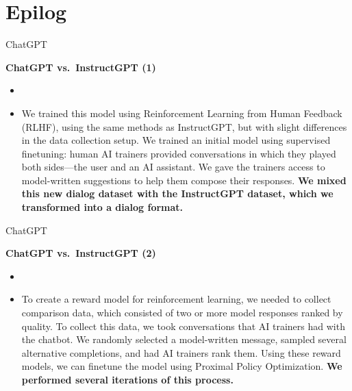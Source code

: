 


\section{Epilog}






\begin{vbframe}{ChatGPT}

\vfill

\textbf{ChatGPT vs.\ InstructGPT (1)}

	\begin{itemize}
		\item \href{https://openai.com/blog/chatgpt}{}
		\item
                We trained this model using Reinforcement
		Learning from Human Feedback (RLHF), using
		the same methods as InstructGPT, but with
		slight differences in the data collection
		setup. We trained an initial model using
		supervised finetuning: human AI trainers
		provided conversations in which they played
		both sides—the user and an AI assistant. We
		gave the trainers access to model-written
		suggestions to help them compose their
		responses. \textbf{We mixed this new dialog
		dataset with the InstructGPT dataset, which
		we transformed into a dialog format.}
	\end{itemize}

\vfill

\end{vbframe}

\begin{vbframe}{ChatGPT}

\vfill

\textbf{ChatGPT vs.\ InstructGPT (2)}

	\begin{itemize}
		\item \href{https://openai.com/blog/chatgpt}{}
		\item
To create a reward model for reinforcement learning, we
		needed to collect comparison data, which
		consisted of two or more model responses
		ranked by quality. To collect this data, we
		took conversations that AI trainers had with
		the chatbot. We randomly selected a
		model-written message, sampled several
		alternative completions, and had AI trainers
		rank them. Using these reward models, we can
		finetune the model using Proximal Policy
		Optimization. \textbf{We performed several
		iterations of this process.}
	\end{itemize}

\vfill

\end{vbframe}


